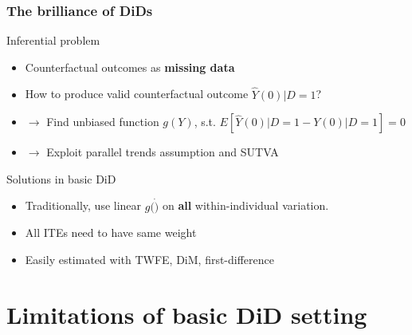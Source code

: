 \documentclass[12pt,aspectratio=169]{beamer}\usepackage[]{graphicx}\usepackage[]{xcolor}
\begin{document}
\begin{frame}
\frametitle{The brilliance of DiDs}

    \begin{alertblock}{Inferential problem}
    \small

    \begin{itemize}[itemsep=0em, topsep=0pt]
        \item Counterfactual outcomes as \textbf{missing data}
        \item How to produce valid counterfactual outcome $\hat{Y}(0)| D = 1$?
        \item $\rightarrow$ Find unbiased function $g(Y)$, s.t.  $E[ \hat{Y}(0)| D = 1 -  Y(0)| D = 1] = 0$
        \item $\rightarrow$ Exploit parallel trends assumption and SUTVA
    \end{itemize}

    \end{alertblock}

    \begin{alertblock}{Solutions in basic DiD}
    \small

    \begin{itemize}[itemsep=0em, topsep=0pt]
        \item Traditionally, use linear $g(\dot)$ on \textbf{all} within-individual variation.
        \item All ITEs need to have same weight
        \item Easily estimated with TWFE, DiM, first-difference
    \end{itemize}

    \end{alertblock}

\end{frame}


\section{Limitations of basic DiD setting }
\end{document}
